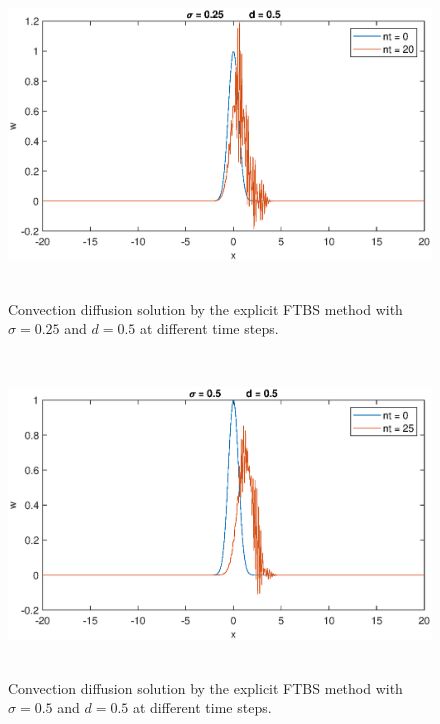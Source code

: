 \documentclass[letterpaper,12pt]{article}
\begin{document}
\begin{figure}[!ht] 
	\centering 
	\includegraphics[max height=8.5cm]{graphs/FTBS/ConvectionDiffusion/sigma025d05.eps}
	\caption{Convection diffusion solution by the explicit FTBS method with $\sigma= 0.25$ and $d=0.5$ at different time steps.}
	 \label{fig:FTBSsigma025d05}
\end{figure}
\begin{figure}[!ht] 
	\centering 
	\includegraphics[max height=8.5cm]{graphs/FTBS/ConvectionDiffusion/sigma05d05.eps}
	\caption{Convection diffusion solution by the explicit FTBS method with $\sigma= 0.5$ and $d=0.5$ at different time steps.}
	 \label{fig:FTBSsigma05d05}
\end{figure}
\newpage
\end{document}
